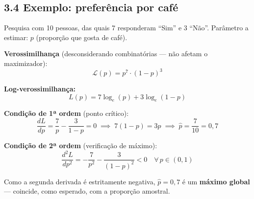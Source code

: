 \documentclass[
  letterpaper,
  DIV=11,
  numbers=noendperiod]{scrartcl}
\begin{document}
\subsection{3.4 Exemplo: preferência por
café}\label{exemplo-preferuxeancia-por-cafuxe9}

Pesquisa com 10 pessoas, das quais 7 responderam ``Sim'' e 3 ``Não''.
Parâmetro a estimar: \(p\) (proporção que gosta de café).

\textbf{Verossimilhança} (desconsiderando combinatórias --- não afetam o
maximizador): \[\mathcal{L}(p) = p^7 \cdot (1-p)^3\]

\textbf{Log-verossimilhança:} \[L(p) = 7\log_e(p) + 3\log_e(1-p)\]

\textbf{Condição de 1ª ordem} (ponto crítico):
\[\frac{dL}{dp} = \frac{7}{p} - \frac{3}{1-p} = 0 \;\implies\; 7(1-p) = 3p \;\implies\; \hat{p} = \frac{7}{10} = 0{,}7\]

\textbf{Condição de 2ª ordem} (verificação de máximo):
\[\frac{d^2L}{dp^2} = -\frac{7}{p^2} - \frac{3}{(1-p)^2} < 0 \quad \forall\, p \in (0,1)\]

Como a segunda derivada é estritamente negativa, \(\hat{p} = 0{,}7\) é
um \textbf{máximo global} --- coincide, como esperado, com a proporção
amostral.
\end{document}
